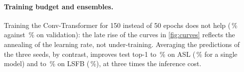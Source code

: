\paragraph{Training budget and ensembles.}
Training the Conv-Transformer for 150 instead of 50 epochs does not help (\numLongVal{}\,\% against
\numRefValTop{}\,\% on validation): the late rise of the curves in \cref{fig:curves} reflects the
annealing of the learning rate, not under-training. Averaging the predictions of the three seeds,
by contrast, improves test top-1 to \numAslEnsTop{}\,\% on ASL (\numTrTestTopMean{}\,\% for a
single model) and to \numLsfbEnsTop{}\,\% on LSFB (\numLsfbScratchTest{}\,\%), at three times the
inference cost.

